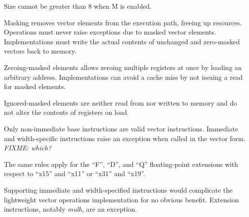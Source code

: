 Size cannot be greater than 8 when M is enabled.

\begin{commentary}
    Masking removes vector elements from the execution path, freeing up resources.
    Operations must never raise exceptions due to masked vector elements.
    Implementations must write the actual contents of unchanged and zero-masked
    vectors back to memory.

    Zeroing-masked elements allows zeroing multiple registers at once by loading an
    arbitrary address.  Implementations can avoid a cache miss by not issuing a read
    for masked elements.

    Ignored-masked elements are neither read from nor written to memory and do not
    alter the contents of registers on load.
\end{commentary}

Only non-immediate base instructions are valid vector instructions.  Immediate and
width-specific instructions raise an exception when called in the vector form.
{\em FIXME:  which?}

The same rules apply for the ``F'', ``D'', and ``Q'' floating-point extensions with
respect to ``x15'' and ``x11'' or ``x31'' and ``x19''.

\begin{commentary}
    Supporting immediate and width-specified instructions would complicate the
    lightweight vector operations implementation for no obvious benefit.  Extension
    instructions, notably {\em mulh}, are an exception.
\end{commentary}

